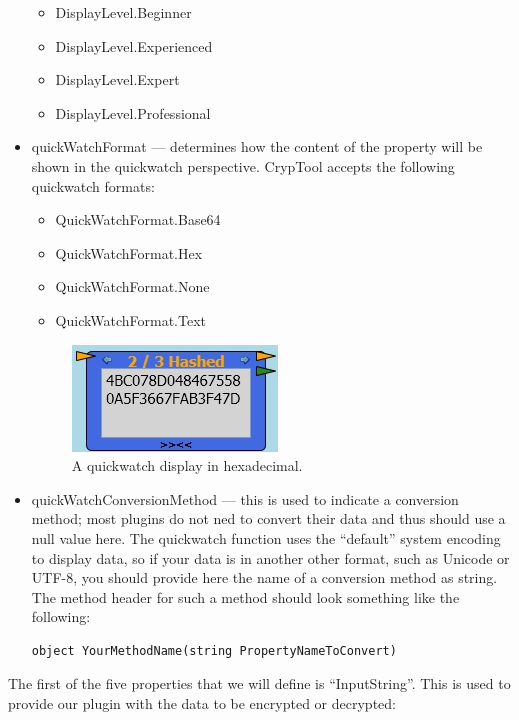 \begin{itemize}
	\begin{itemize}
		\item DisplayLevel.Beginner
		\item DisplayLevel.Experienced
		\item DisplayLevel.Expert
		\item DisplayLevel.Professional
	\end{itemize}
\clearpage
	
	\item quickWatchFormat --- determines how the content of the property will be shown in the quickwatch perspective. CrypTool accepts the following quickwatch formats:
	
	\begin{itemize}
		\item QuickWatchFormat.Base64
		\item QuickWatchFormat.Hex
		\item QuickWatchFormat.None
		\item QuickWatchFormat.Text
	\end{itemize}

\begin{figure}[h]
	\centering
		\includegraphics{figures/quick_watch.jpg}
	\caption{A quickwatch display in hexadecimal.}
	\label{fig:quick_watch}
\end{figure}
	
	\item quickWatchConversionMethod --- this is used to indicate a conversion method; most plugins do not ned to convert their data and thus should use a null value here. The quickwatch function uses the ``default'' system encoding to display data, so if your data is in another other format, such as Unicode or UTF-8, you should provide here the name of a conversion method as string. The method header for such a method should look something like the following:

\begin{lstlisting}
object YourMethodName(string PropertyNameToConvert)
\end{lstlisting}

\end{itemize}

The first of the five properties that we will define is ``InputString''. This is used to provide our plugin with the data to be encrypted or decrypted:

